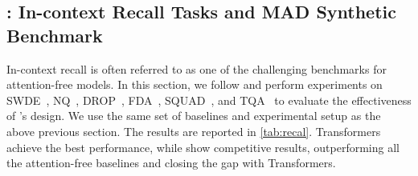 \subsection{\model: In-context Recall Tasks and MAD Synthetic Benchmark}\label{sec:retrieval-tasks}
In-context recall is often referred to as one of the challenging benchmarks for attention-free models. In this section, we follow \citet{arora2024simple} and perform experiments on SWDE~\citep{lockard2019openceres}, NQ~\citep{kwiatkowski2019natural}, DROP~\citep{dua2019drop}, FDA~\citep{arora2023language}, SQUAD~\citep{rajpurkar2016squad}, and TQA~\citep{kembhavi2017you} to evaluate the effectiveness of \model's design. We use the same set of baselines and experimental setup as the above previous section. The results are reported in \autoref{tab:recal}. Transformers achieve the best performance, while \model{} show competitive results, outperforming all the attention-free baselines and closing the gap with Transformers. 



